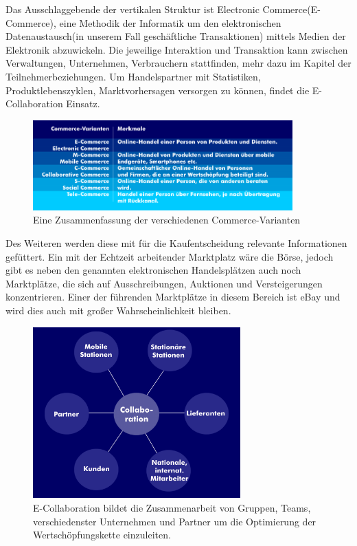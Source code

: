 \documentclass[11pt,a4paper]{article}
\begin{document}
\noindent Das Ausschlaggebende der vertikalen Struktur ist Electronic Commerce(E-Commerce), eine Methodik der Informatik um den elektronischen Datenaustausch(in unserem Fall geschäftliche Transaktionen) mittels Medien der Elektronik abzuwickeln. Die jeweilige Interaktion und Transaktion kann zwischen Verwaltungen, Unternehmen, Verbrauchern stattfinden, mehr dazu im Kapitel der Teilnehmerbeziehungen. Um Handelspartner mit Statistiken, Produktlebenszyklen, Marktvorhersagen versorgen zu können, findet die E-Collaboration Einsatz.
\begin{figure}[ht!]
	\centering
	\includegraphics[width=100mm]{e-commerce-varianten}
	\caption{Eine Zusammenfassung der verschiedenen Commerce-Varianten \label{e-commerce-varianten}}
\end{figure}

\newpage

\noindent Des Weiteren werden diese mit für die Kaufentscheidung relevante Informationen gefüttert. Ein mit der Echtzeit arbeitender Marktplatz wäre die Börse, jedoch gibt es neben den genannten elektronischen Handelsplätzen auch noch Marktplätze, die sich auf Ausschreibungen, Auktionen und Versteigerungen konzentrieren. Einer der führenden Marktplätze in diesem Bereich ist eBay und wird dies auch mit großer Wahrscheinlichkeit bleiben.

\begin{figure}[ht!]
	\centering
	\includegraphics[width=80mm]{collaboration}
	\caption{E-Collaboration bildet die Zusammenarbeit von Gruppen, Teams, verschiedenster Unternehmen und Partner um die Optimierung der Wertschöpfungskette einzuleiten. \label{collaboration}}
\end{figure}
\end{document}
